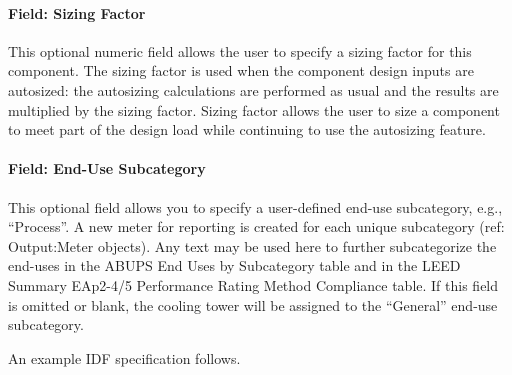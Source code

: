 \paragraph{Field: Sizing Factor}\label{field-sizing-factor-1}

This optional numeric field allows the user to specify a sizing factor for this component. The sizing factor is used when the component design inputs are autosized: the autosizing calculations are performed as usual and the results are multiplied by the sizing factor. Sizing factor allows the user to size a component to meet part of the design load while continuing to use the autosizing feature.

\paragraph{Field: End-Use Subcategory}\label{end-use-subcategory-03}

This optional field allows you to specify a user-defined end-use subcategory, e.g., ``Process''. A new meter for reporting is created for each unique subcategory (ref: Output:Meter objects). Any text may be used here to further subcategorize the end-uses in the ABUPS End Uses by Subcategory table and in the LEED Summary EAp2-4/5 Performance Rating Method Compliance table. If this field is omitted or blank, the cooling tower will be assigned to the ``General'' end-use subcategory.

An example IDF specification follows.

